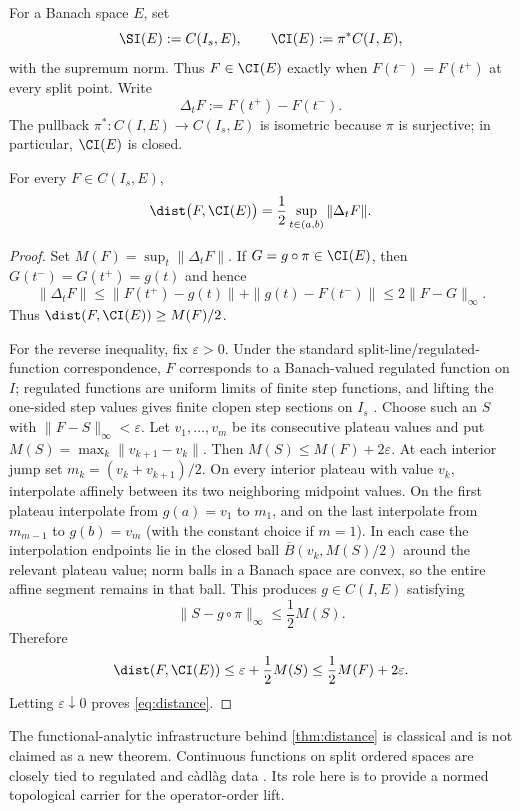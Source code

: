 For a Banach space $E$, set
\[
\SI(E):=C(I_s,E),\qquad \CI(E):=\pi^*C(I,E),
\]
with the supremum norm. Thus $F\in\CI(E)$ exactly when $F(t^-)=F(t^+)$ at every split point. Write
\[
\Delta_tF:=F(t^+)-F(t^-).
\]
The pullback $\pi^*:C(I,E)\to C(I_s,E)$ is isometric because $\pi$ is surjective; in particular, $\CI(E)$ is closed.

\begin{theorem}\label{thm:distance}
For every $F\in C(I_s,E)$,
\begin{equation}\label{eq:distance}
\dist\bigl(F,\CI(E)\bigr)=\frac12\sup_{t\in(a,b)}\|\Delta_tF\|.
\end{equation}
\end{theorem}
\begin{proof}
Set $M(F)=\sup_t\|\Delta_tF\|$. If $G=g\circ\pi\in\CI(E)$, then $G(t^-)=G(t^+)=g(t)$ and hence
\[
\|\Delta_tF\|\le \|F(t^+)-g(t)\|+\|g(t)-F(t^-)\|\le 2\|F-G\|_\infty.
\]
Thus $\dist(F,\CI(E))\ge M(F)/2$.

For the reverse inequality, fix $\varepsilon>0$. Under the standard split-line/regulated-function correspondence, $F$ corresponds to a Banach-valued regulated function on $I$; regulated functions are uniform limits of finite step functions, and lifting the one-sided step values gives finite clopen step sections on $I_s$ \cite{ref1,ref14}. Choose such an $S$ with $\|F-S\|_\infty<\varepsilon$. Let $v_1,\dots,v_m$ be its consecutive plateau values and put $M(S)=\max_k\|v_{k+1}-v_k\|$. Then $M(S)\le M(F)+2\varepsilon$. At each interior jump set $m_k=(v_k+v_{k+1})/2$. On every interior plateau with value $v_k$, interpolate affinely between its two neighboring midpoint values. On the first plateau interpolate from $g(a)=v_1$ to $m_1$, and on the last interpolate from $m_{m-1}$ to $g(b)=v_m$ (with the constant choice if $m=1$). In each case the interpolation endpoints lie in the closed ball $\overline B(v_k,M(S)/2)$ around the relevant plateau value; norm balls in a Banach space are convex, so the entire affine segment remains in that ball. This produces $g\in C(I,E)$ satisfying
\[
\|S-g\circ\pi\|_\infty\le \frac12M(S).
\]
Therefore
\[
\dist(F,\CI(E))\le \varepsilon+\frac12M(S)\le \frac12M(F)+2\varepsilon.
\]
Letting $\varepsilon\downarrow0$ proves \eqref{eq:distance}.
\end{proof}

The functional-analytic infrastructure behind \cref{thm:distance} is classical and is not claimed as a new theorem. Continuous functions on split ordered spaces are closely tied to regulated and c\`adl\`ag data \cite{ref1,ref2,ref14}. Its role here is to provide a normed topological carrier for the operator-order lift.

